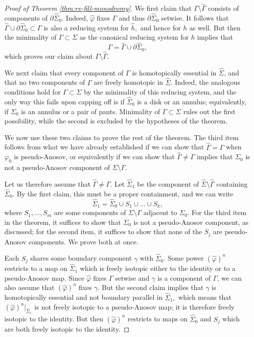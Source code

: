 \documentclass[11pt]{amsart}
\numberwithin{equation}{section}
\numberwithin{theorem}{section}
\theoremstyle{definition}
\begin{document}
\begin{proof}[Proof of Theorem \ref{thm:rv-fill-monodromy}]
We first claim that $\Gamma\setminus \hat\Gamma$ consists of components of $\partial \hat\Sigma_0$. Indeed, $\hat\varphi$ fixes $\Gamma$ and thus $\partial \hat\Sigma_0$ setwise. It follows that $\hat\Gamma\cup \partial \hat\Sigma_0\subset \Gamma$ is also a reducing system for $\hat h,$ and hence for $h$ as well. But then the minimality of $\Gamma\subset \Sigma$ as the canonical reducing system for $h$ implies that \[\Gamma = \hat\Gamma \cup \partial \hat\Sigma_0,\] which proves our claim about $\Gamma\setminus \hat\Gamma$.

We next claim that every component of $\Gamma$ is homotopically essential in $\hat\Sigma$, and that no two components of $\Gamma$ are freely homotopic in $\hat\Sigma$. Indeed, the analogous conditions hold for $\Gamma \subset \Sigma$ by the minimality of this reducing system, and the only way this fails upon capping off is if $\hat\Sigma_0$ is a disk or an annulus;  equivalently, if $\Sigma_0$ is an annulus or a pair of pants.  Minimality of $\Gamma\subset \Sigma$ rules out the first possibility, while the second is excluded  by the hypotheses of the theorem. 

We now use these two claims to prove the rest of the theorem.   The third item follows from what we have already established if we can show that $\hat\Gamma = \Gamma$ when $\varphi_0$ is pseudo-Anosov, or equivalently if we can show that $\hat\Gamma \neq \Gamma$ implies that $\Sigma_0$ is not a pseudo-Anosov component of $\Sigma\setminus \Gamma$. 

Let us therefore assume that  $\hat\Gamma \neq \Gamma$.  Let $\hat\Sigma_1$ be the component of $\hat\Sigma\setminus \hat\Gamma$ containing $\hat\Sigma_0$. By the first claim,  this must be a proper containment, and we can write \[\hat\Sigma_1=\hat\Sigma_0 \cup S_1\cup \dots \cup S_k,\] where  $S_1,\dots,S_m$ are some components of $\Sigma\setminus \Gamma$   adjacent to $\Sigma_0$. For the third item in the theorem, it suffices to show that $\Sigma_0$ is not a pseudo-Anosov component, as discussed; for the second item, it suffices to show that none of the $S_j$ are pseudo-Anosov components. We  prove both at once.

Each $S_j$ shares some boundary component $\gamma$ with $\hat\Sigma_0$. Some power $(\hat\varphi)^n$ restricts to a map on $\hat\Sigma_1$ which is freely isotopic either to the identity or to a pseudo-Anosov map. Since  $\hat\varphi$ fixes $\Gamma$ setwise and $\gamma$ is a component of $\Gamma$, we can also assume that $(\hat\varphi)^n$ fixes  $\gamma$. But the second claim implies that $\gamma$ is homotopically essential and not boundary parallel in $\hat\Sigma_1,$ which means that $(\hat\varphi)^n|_{\hat\Sigma_1}$ is not freely isotopic to a pseudo-Anosov map; it is therefore freely isotopic to the identity. But then $(\hat\varphi)^n$ restricts to maps on $\hat\Sigma_0$ and $S_j$ which are  both freely isotopic to the identity. 


\end{proof}
\end{document}

